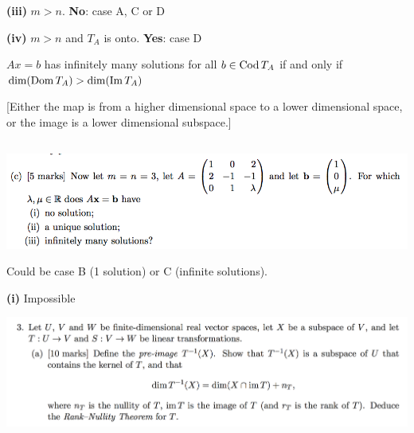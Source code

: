 \documentclass[12pt]{article}
\begin{document}

\textbf{(iii)} $m > n$. \textbf{No}: case A, C or D


\textbf{(iv)} $m > n$ and $T_A$ is onto. \textbf{Yes}: case D

\begin{lemma*}
  $Ax = b$ has infinitely many solutions for all $b \in \operatorname{\mathrm{Cod}} T_A$ if and only
  if $\dim(\operatorname{\mathrm{Dom}} T_A) > \dim(\operatorname{\mathrm{Im}} T_A)$
\end{lemma*}

[Either the map is from a higher dimensional space to a lower dimensional
space, or the image is a lower dimensional subspace.]


\subsection*{} %
\begin{mdframed}
\includegraphics[width=400pt]{img/oxford-prelims-2017-A-2-3.png}
\end{mdframed}

Could be case B (1 solution) or C (infinite solutions).

\textbf{(i)} Impossible

\newpage
\begin{mdframed}
\includegraphics[width=400pt]{img/oxford-prelims-2017-A-3-1.png}
\end{mdframed}
\end{document}
